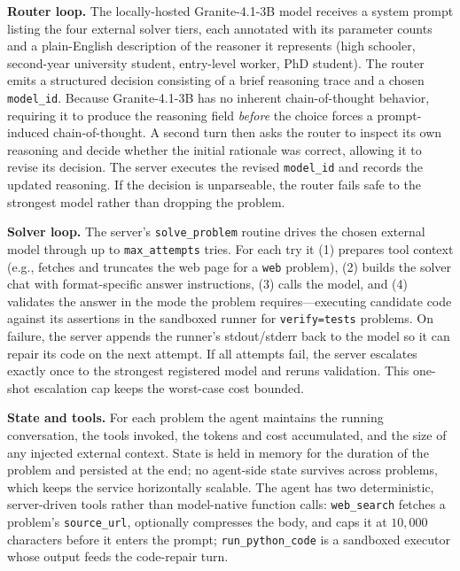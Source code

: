 \documentclass[10pt]{article}
\begin{document}
\textbf{Router loop.}
The locally-hosted Granite-4.1-3B model receives a system prompt listing the four
external solver tiers, each annotated with its parameter counts and a plain-English
description of the reasoner it represents (high schooler, second-year university
student, entry-level worker, PhD student). The router emits a structured decision
consisting of a brief reasoning trace and a chosen \texttt{model\_id}. Because
Granite-4.1-3B has no inherent chain-of-thought behavior, requiring it to produce the
reasoning field \emph{before} the choice forces a prompt-induced chain-of-thought. A
second turn then asks the router to inspect its own reasoning and decide whether the
initial rationale was correct, allowing it to revise its decision. The server executes
the revised \texttt{model\_id} and records the updated reasoning. If the decision is
unparseable, the router fails safe to the strongest model rather than dropping the
problem.

\textbf{Solver loop.}
The server's \texttt{solve\_problem} routine drives the chosen external model through
up to \texttt{max\_attempts} tries. For each try it (1) prepares tool context (e.g.,
fetches and truncates the web page for a \texttt{web} problem), (2) builds the solver
chat with format-specific answer instructions, (3) calls the model, and (4) validates
the answer in the mode the problem requires---executing candidate code against its
assertions in the sandboxed runner for \texttt{verify=tests} problems. On failure, the
server appends the runner's stdout/stderr back to the model so it can repair its code
on the next attempt. If all attempts fail, the server escalates exactly once to the
strongest registered model and reruns validation. This one-shot escalation cap keeps
the worst-case cost bounded.

\textbf{State and tools.}
For each problem the agent maintains the running conversation, the tools invoked, the
tokens and cost accumulated, and the size of any injected external context. State is
held in memory for the duration of the problem and persisted at the end; no agent-side
state survives across problems, which keeps the service horizontally scalable. The
agent has two deterministic, server-driven tools rather than model-native function
calls: \texttt{web\_search} fetches a problem's \texttt{source\_url}, optionally
compresses the body, and caps it at $10{,}000$ characters before it enters the prompt;
\texttt{run\_python\_code} is a sandboxed executor whose output feeds the code-repair
turn.
\end{document}
